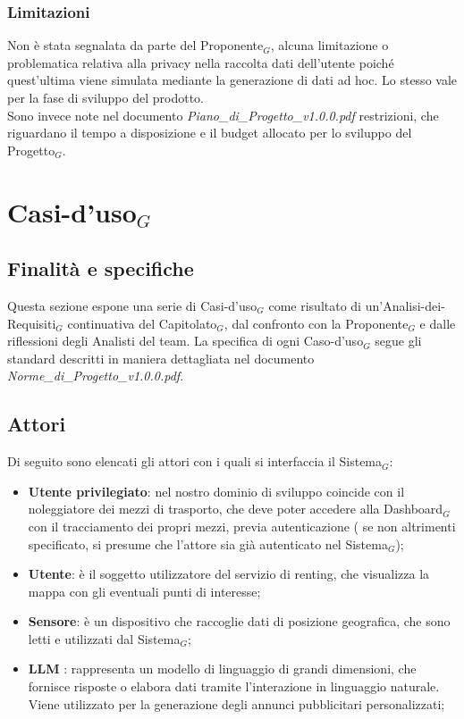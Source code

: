 \documentclass[10pt]{article}
\begin{document}
\begin{justify}
\subsubsection{Limitazioni}
Non è stata segnalata da parte del Proponente$_G$, alcuna limitazione o problematica relativa alla privacy nella raccolta dati dell'utente poiché quest'ultima viene simulata mediante la generazione di dati ad hoc. Lo stesso vale per la fase di sviluppo del prodotto.\\
Sono invece note nel documento \textit{Piano\_di\_Progetto\_v1.0.0.pdf} restrizioni, che riguardano il tempo a disposizione e il budget allocato per lo sviluppo del Progetto$_G$. 

\newpage
\section{Casi-d'uso$_G$}
\label{sec:casi-uso}

\subsection{Finalità e specifiche}
Questa sezione espone una serie di Casi-d'uso$_G$ come risultato di un'Analisi-dei-Requisiti$_G$ continuativa del Capitolato$_G$, dal confronto con la Proponente$_G$ e dalle riflessioni degli Analisti del team. La specifica di ogni Caso-d'uso$_G$ segue gli standard descritti in maniera dettagliata nel documento \textit{Norme\_di\_Progetto\_v1.0.0.pdf}.
\subsection{Attori}
Di seguito sono elencati gli attori con i quali si interfaccia il Sistema$_G$:
\begin{itemize}
    \item \textbf{Utente privilegiato}: nel nostro dominio di sviluppo coincide con il noleggiatore dei mezzi di trasporto, che deve poter accedere alla Dashboard$_G$ con il tracciamento dei propri mezzi, previa autenticazione ( se non altrimenti specificato, si presume che l'attore sia già autenticato nel Sistema$_G$);
    \item \textbf{Utente}: è il soggetto utilizzatore del servizio di renting, che visualizza la mappa con gli eventuali punti di interesse;
    \item \textbf{Sensore}: è un dispositivo che raccoglie dati di posizione geografica, che sono letti e utilizzati dal Sistema$_G$;
    \item \textbf{LLM} : rappresenta un modello di linguaggio di grandi dimensioni, che fornisce risposte o elabora dati tramite l'interazione in linguaggio naturale. Viene utilizzato per la generazione degli annunci pubblicitari personalizzati;
\end{itemize}


\end{justify}
\end{document}
